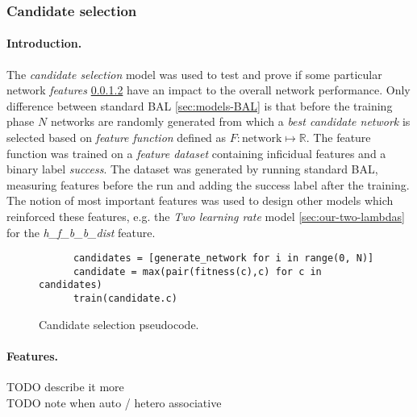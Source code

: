 \subsubsection{Candidate selection} 
\label{sec:our-candidates} 

\paragraph{Introduction.} 
The \emph{candidate selection} model was used to test and prove if some particular network \emph{features} \ref{sec:our-candidates-features} have an impact to the overall network performance. Only difference between standard BAL \ref{sec:models-BAL} is that before the training phase $N$ networks are randomly generated from which a \emph{best candidate network} is selected based on \emph{feature function} defined as $F: \mbox{network} \mapsto \mathbb{R}$. The feature function was trained on a \emph{feature dataset} containing inficidual features and a binary label \emph{success}. The dataset was generated by running standard BAL, measuring features before the run and adding the success label after the training. The notion of most important features was used to design other models which reinforced these features, e.g. the \emph{Two learning rate} model \ref{sec:our-two-lambdas} for the \emph{h\_f\_b\_b\_dist} feature. 

\begin{figure}[H]
  \caption{Candidate selection pseudocode.}
  \label{fig:our-candidates-pseudocode} 
    \begin{lstlisting} 
      candidates = [generate_network for i in range(0, N)] 
      candidate = max(pair(fitness(c),c) for c in candidates) 
      train(candidate.c) 
    \end{lstlisting} 
\end{figure} 

\paragraph{Features.}
\label{sec:our-candidates-features}

TODO describe it more \\
TODO note when auto / hetero associative \\

